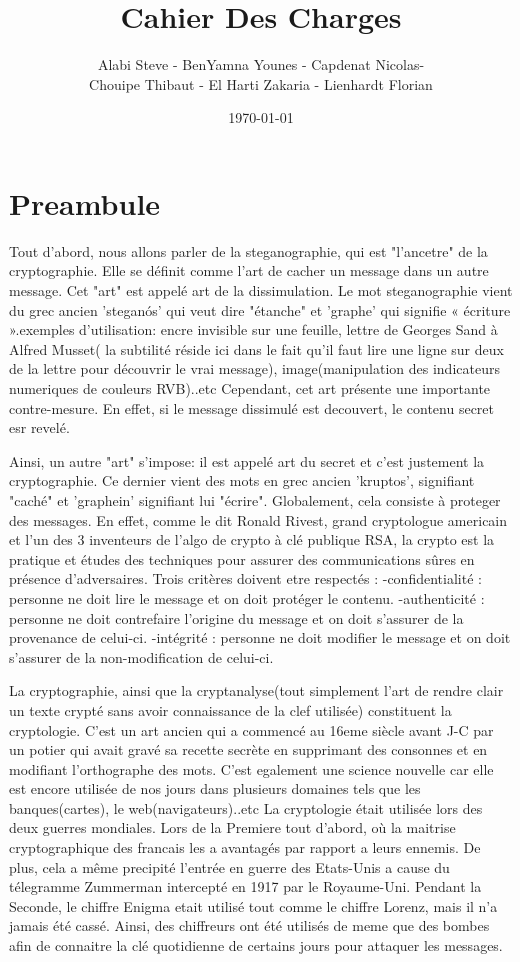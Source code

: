 \documentclass[a4]{article}
\author{Alabi Steve - BenYamna Younes - Capdenat Nicolas- \\
		Chouipe Thibaut - El Harti Zakaria - Lienhardt Florian}
\title{Cahier Des Charges}
\date{\today}
\begin{document}
\maketitle
		\section{Preambule}
				Tout d'abord, nous allons parler de la steganographie, qui est "l'ancetre" de la cryptographie. Elle se définit comme l'art de cacher un message dans un autre message. Cet "art"
				est appelé art de la dissimulation. Le mot steganographie vient du grec 	ancien 'steganós' qui veut dire "étanche" et 'graphe' qui signifie « écriture ».exemples d'utilisation: 
				encre invisible sur une feuille, lettre de Georges Sand à Alfred Musset( la subtilité réside ici dans le fait qu'il faut lire une ligne sur deux de la lettre pour découvrir le vrai message),
				image(manipulation des indicateurs numeriques de couleurs RVB)..etc
				Cependant, cet art présente une importante contre-mesure. En effet, si le message dissimulé est decouvert, le contenu secret esr revelé.

				Ainsi, un autre "art" s'impose: il est appelé art du secret et c'est justement la cryptographie. Ce dernier vient des mots en grec ancien 'kruptos', signifiant "caché" et 'graphein'
				signifiant lui "écrire". Globalement, cela consiste à proteger des messages. En effet, comme le dit Ronald Rivest, grand cryptologue americain et l'un des 3 inventeurs de l'algo
				de crypto à clé publique RSA, la crypto est la pratique et études des techniques pour assurer des communications sûres en présence d'adversaires.
				Trois critères doivent etre respectés : 
				-confidentialité : personne ne doit lire le message et on doit protéger le contenu.
				-authenticité : personne ne doit contrefaire l'origine du message et on doit s'assurer de la provenance de celui-ci.
				-intégrité : personne ne doit modifier le message et on doit s'assurer de la non-modification de celui-ci.

				La cryptographie, ainsi que la cryptanalyse(tout simplement l'art de rendre clair un texte crypté sans avoir connaissance de la clef utilisée) constituent la cryptologie.
				C'est un art ancien qui a commencé au 16eme siècle avant J-C par un potier qui avait gravé sa recette secrète en supprimant des consonnes et en modifiant l'orthographe des mots.
				C'est egalement une science nouvelle car elle est encore utilisée de nos jours dans plusieurs domaines tels que les banques(cartes), le web(navigateurs)..etc
				La cryptologie était utilisée lors des deux guerres mondiales. Lors de la Premiere tout d'abord, où la maitrise cryptographique des francais les a avantagés par rapport a leurs
				ennemis. De plus, cela a même precipité l'entrée en guerre des Etats-Unis a cause du télegramme Zummerman intercepté en 1917 par le Royaume-Uni.
				Pendant la Seconde, le chiffre Enigma etait utilisé tout comme le chiffre Lorenz, mais il n'a jamais été cassé. Ainsi, des chiffreurs ont été utilisés de meme que des bombes afin de 
				connaitre la clé quotidienne de certains jours pour attaquer les messages.
				
\end{document}
